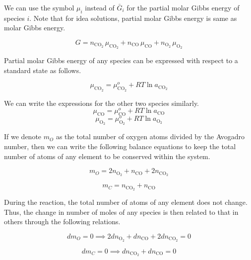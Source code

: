 We can use the symbol $\mu_i$ instead of $\bar{G}_i$ for the partial molar Gibbs energy of species $i$. Note that for idea solutions, partial molar Gibbs energy is same as molar Gibbs energy.

\begin{equation}
 G = n_{\text{CO}_2} \, \mu_{\text{CO}_2} + n_\text{CO} \, \mu_\text{CO} + n_{\text{O}_2} \, \mu_{\text{O}_2} \end{equation}

Partial molar Gibbs energy of any species can be expressed with respect to a standard state as follows.

\begin{equation}
 \mu_{\text{CO}_2} = \mu^o_{\text{CO}_2} + R T \ln a_{\text{CO}_2} \end{equation}

We can write the expressions for the other two species similarly.
\begin{equation}
 \mu_\text{CO} = \mu^o_\text{CO} + R T \ln a_\text{CO} \end{equation}
\begin{equation}
 \mu_{\text{O}_2} = \mu^o_{\text{O}_2} + R T \ln a_{\text{O}_2} \end{equation}

If we denote $m_O$ as the total number of oxygen atoms divided by the Avogadro number, then we can write the following balance equations to keep the total number of atoms of any element to be conserved within the system.

\begin{equation}
 m_O = 2 n_{\text{O}_2} + n_\text{CO} + 2 n_{\text{CO}_2} \end{equation}

\begin{equation}
 m_C = n_{\text{CO}_2} + n_\text{CO} \end{equation}

During the reaction, the total number of atoms of any element does not change. Thus, the change in number of moles of any species is then related to that in others through the following relations.

\begin{equation}
 dm_O = 0 \implies 2 dn_{\text{O}_2} + dn_\text{CO} + 2 dn_{\text{CO}_2} = 0\end{equation}

\begin{equation}
 dm_C = 0 \implies dn_{\text{CO}_2} + dn_\text{CO} = 0 	\end{equation}

